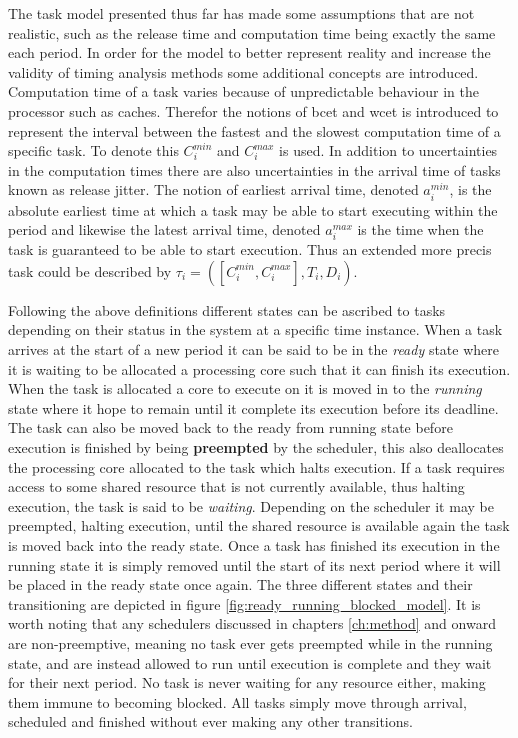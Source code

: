 \documentclass{kththesis}
\begin{document}
The task model presented thus far has made some assumptions that are not realistic, such as the
release time and computation time being exactly the same each period. In order for the model to
better represent reality and increase the validity of timing analysis methods some additional
concepts are introduced. Computation time of a task varies because of unpredictable behaviour in the
processor such as caches. Therefor the notions of \acrfull{bcet} and \acrfull{wcet} is introduced to
represent the interval between the fastest and the slowest computation time of a specific task. To
denote this $ C_i^{min} $ and $ C_i^{max} $ is used. In addition to uncertainties in the computation
times there are also uncertainties in the arrival time of tasks known as release jitter. The notion
of earliest arrival time, denoted $ a_i^{min} $, is the  absolute earliest time at which a task may
be able to start executing within the period and likewise the latest arrival time, denoted $
a_i^{max} $ is the time when the task is guaranteed to be able to start execution. Thus an extended
more precis task could be described by $ \tau_i = ( [C_i^{min}, C_i^{max}], T_i, D_i) $.

Following the above definitions different states can be ascribed to tasks depending on their
status in the system at a specific time instance. When a task arrives at the start of a new period
it can be said to be in the \textit{ready} state where it is waiting to be allocated a processing
core such that it can finish its execution. When the task is allocated a core to execute on it is
moved in to the \textit{running} state where it hope to remain until it complete its execution
before its deadline. The task can also be moved back to the ready from running state before
execution is finished by being \textbf{preempted} by the scheduler, this also deallocates the
processing core allocated to the task which halts execution. If a task requires access to
some shared resource that is not currently available, thus halting execution, the task is said to be
\textit{waiting}. Depending on the scheduler it may be preempted, halting execution, until the
shared resource is available again the task is moved back into the ready state. Once a task has
finished its execution in the running state it is simply removed until the start of its next period
where it will be placed in the ready state once again. The three different states
and their transitioning are depicted in figure \ref{fig:ready_running_blocked_model}. It is worth
noting that any schedulers discussed in chapters \ref{ch:method} and onward are non-preemptive,
meaning no task ever gets preempted while in the running state, and are instead allowed to run until
execution is complete and they wait for their next period. No task is never waiting for any resource
either, making them immune to becoming blocked. All tasks simply move through arrival, scheduled and
finished without ever making any other transitions. 
\end{document}
